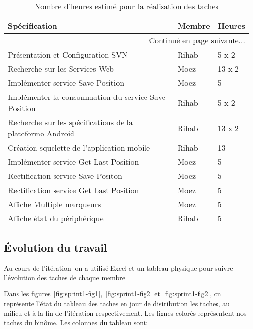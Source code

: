\begin{center}
    \begin{longtable}{| l | l | l |}
        \caption{Nombre d'heures estimé pour la réalisation des taches}
        \label{tab:sprint1-estimation} \\

        \hline
        \textbf{Spécification} & \textbf{Membre} & \textbf{Heures} \\ \hline
        \endhead

        \hline \multicolumn{3}{|r|}{{Continué en page suivante$\dotsc$}} \\ \hline
        \endfoot

        \hline \hline
        \endlastfoot

        \hline
Présentation et Configuration SVN & Rihab & 5 x 2 \\ \hline
Recherche sur les Services Web & Moez & 13 x 2 \\ \hline
Implémenter service Save Position & Moez & 5 \\ \hline
Implémenter la consommation du service Save Position & Rihab & 5 x 2 \\ \hline
Recherche sur les spécifications de la plateforme Android & Rihab & 13 x 2 \\ \hline
Création squelette de l'application mobile & Rihab & 13 \\ \hline
Implémenter service Get Last Position & Moez & 5 \\ \hline
Rectification service Save Positon & Moez & 5 \\ \hline
Rectification service Get Last Position & Moez & 5 \\ \hline
Affiche Multiple marqueurs & Moez & 5 \\ \hline
Affiche état du périphérique & Rihab & 5 \\ \hline
    \end{longtable}
\end{center}

\subsection{Évolution du travail}

Au cours de l'itération, on a utilisé Excel et un tableau physique pour suivre
l'évolution des taches de chaque membre.

\clearpage %

Dans les figures~\ref{fig:sprint1-fig1},~\ref{fig:sprint1-fig2}
et~\ref{fig:sprint1-fig2}, on représente l'état du tableau des taches en jour
de distribution les taches, au milieu et à la fin de l'itération
respectivement. Les lignes colorés représentent nos taches du binôme. Les
colonnes du tableau sont:

